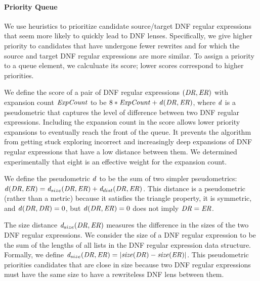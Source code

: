 \documentclass[numbers,10pt,preprint\ifanon ,nocopyrightspace\fi]{sigplanconf}
\begin{document}
\paragraph*{Priority Queue}
We use heuristics to prioritize candidate source/target DNF
regular expressions that seem more likely to quickly lead to DNF
lenses.  Specifically, we give higher priority to candidates that have
undergone fewer rewrites and for which the source and target DNF
regular expressions are more similar.  To assign a priority to a queue
element, we calculuate its score; lower scores correspond to higher
priorities. 

We define the score of a pair of DNF regular expressions
$(\mathit{DR}{},\mathit{ER}{})$ with expansion count $\mathit{ExpCount}$ to be
$8*\mathit{ExpCount}+ \mathit{d}(\mathit{DR}{},\mathit{ER}{})$, where
$\mathit{d}$ is a pseudometric that captures the level of difference
between two DNF regular expressions.  Including the expansion count in
the score allows lower priority expansions to eventually reach the
front of the queue. It prevents the algorithm from getting stuck
exploring incorrect and increasingly deep expansions of DNF regular
expressions that have a low distance between them.  We determined
experimentally that eight is an effective weight for the expansion
count.

We define the pseudometric $\mathit{d}$ to be the sum of two simpler
pseudometrics: $\mathit{d}(\mathit{DR},\mathit{ER})
= \mathit{d}_{size}(\mathit{DR},\mathit{ER})+\mathit{d}_{dist}(\mathit{DR},\mathit{ER})$.
This distance is a pseudometric (rather than a metric) because it
satisfies the triangle property, it is symmetric, and
$\mathit{d}(\mathit{DR},\mathit{DR}) = 0$, but
$\mathit{d}(\mathit{DR},\mathit{ER}) = 0$ does not imply $\mathit{DR} =
\mathit{ER}$. 

The size distance $\mathit{d}_{size}(\mathit{DR},\mathit{ER})$ measures
the difference in the sizes of the two DNF regular expressions.
We consider the size of a DNF regular expression to be the
sum of the lengths of all lists in the DNF regular expression data
structure.  Formally, we define
$\mathit{d}_{size}(\mathit{DR},\mathit{ER})=|\mathit{size}(\mathit{DR})-\mathit{size}(\mathit{ER})|$. 
This pseudometric priorities
candidates that are close in size because
two DNF regular expressions must have the same size to have a
rewriteless DNF lens between them.
\end{document}
